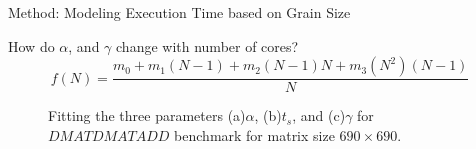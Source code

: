 \documentclass[10pt]{beamer}
\begin{document}
\begin{frame}{Method: Modeling Execution Time based on Grain Size}
	\begin{outline}	
	\1How do $\alpha$, and $\gamma$ change with number of cores?
		$$f(N)=\frac{m_0+m_1(N-1)+m_2(N-1)N+m_3(N^2)(N-1)}{N}$$
	\begin{figure}[]
		\centering
		\hfill	
		\caption{Fitting the three parameters (a)$\alpha$, (b)$t_s$, and (c)$\gamma$ for $DMATDMATADD$ benchmark for matrix size $690\times690$.}	
		\label{fig24}
	\end{figure}
\end{outline}
\end{frame}
\end{document}
